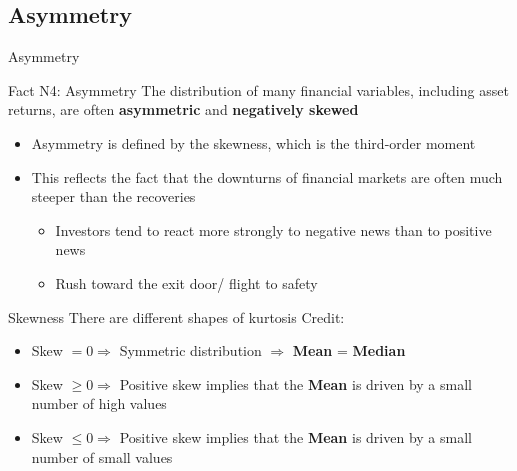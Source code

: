 \documentclass{beamer}
\begin{document}
\subsection{Asymmetry}
\begin{frame}{Asymmetry}

  \begin{exampleblock}{Fact N4: Asymmetry}
    The distribution of many financial variables, including asset returns, are often \textbf{asymmetric} and \textbf{negatively skewed}
  \end{exampleblock}

  \begin{itemize}
  \item Asymmetry is defined by the skewness, which is the third-order moment
  \item This reflects the fact that the downturns of financial markets are often much steeper than the recoveries
  \begin{itemize}
    \item Investors tend to react more strongly to negative news than to positive news 
    \item Rush toward the exit door/ flight to safety
  \end{itemize}
  \end{itemize}
\end{frame}


\begin{frame}{Skewness}
  There are different shapes of kurtosis 
  \hspace*{15pt}\hbox{\scriptsize Credit:} 
  \begin{itemize}
      \item Skew $= 0 \Rightarrow$  Symmetric distribution $\Rightarrow$ \textbf{Mean} = \textbf{Median}
      \item Skew $\geq 0 \Rightarrow$ Positive skew implies that the \textbf{Mean} is driven by a small number of high values
      \item Skew $\leq 0 \Rightarrow$ Positive skew implies that the \textbf{Mean} is driven by a small number of small values
  \end{itemize}
  
\end{frame}
\end{document}
